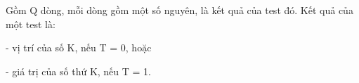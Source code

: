 Gồm Q dòng, mỗi dòng gồm một số nguyên, là kết quả của test đó. Kết quả của một test là:

- vị trí của số K, nếu T = 0, hoặc

- giá trị của số thứ K, nếu T = 1.